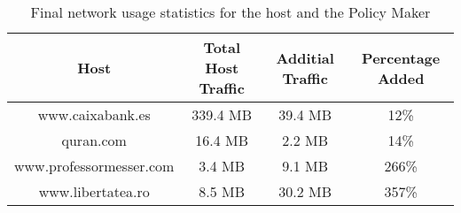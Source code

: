 \begin{table}[h]
\begin{center}
\begin{tabular}{| c c c c |}
	\hline
	Host & Total Host Traffic & Additial Traffic & Percentage Added \\ \hline
	www.caixabank.es        & 339.4 MB & 39.4 MB &  12\% \\ \hline
	quran.com               &  16.4 MB &  2.2 MB &  14\% \\ \hline
	www.professormesser.com &   3.4 MB &  9.1 MB & 266\% \\ \hline
	www.libertatea.ro       &   8.5 MB & 30.2 MB & 357\% \\ \hline
\end{tabular}
\end{center}
	\caption{Final network usage statistics for the host and the Policy Maker}
\label{tab:percentage}
\end{table}
%
%												
%
%
%
%
% 
% 
